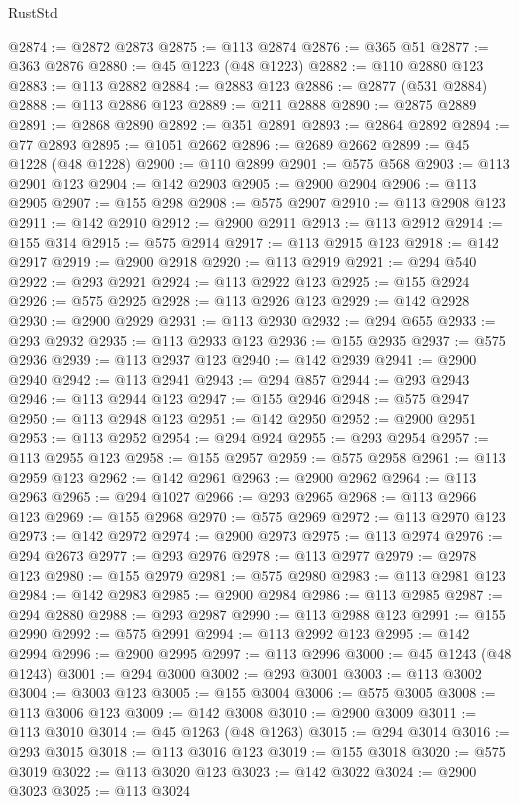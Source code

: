 \begin{lexlean}{RustStd}
\begin{coremodule}
@2874 := @2872 @2873
@2875 := @113 @2874
@2876 := @365 @51
@2877 := @363 @2876
@2880 := @45 @1223 (@48 @1223)
@2882 := @110 @2880 @123
@2883 := @113 @2882
@2884 := @2883 @123
@2886 := @2877 (@531 @2884)
@2888 := @113 @2886 @123
@2889 := @211 @2888
@2890 := @2875 @2889
@2891 := @2868 @2890
@2892 := @351 @2891
@2893 := @2864 @2892
@2894 := @77 @2893
@2895 := @1051 @2662
@2896 := @2689 @2662
@2899 := @45 @1228 (@48 @1228)
@2900 := @110 @2899
@2901 := @575 @568
@2903 := @113 @2901 @123
@2904 := @142 @2903
@2905 := @2900 @2904
@2906 := @113 @2905
@2907 := @155 @298
@2908 := @575 @2907
@2910 := @113 @2908 @123
@2911 := @142 @2910
@2912 := @2900 @2911
@2913 := @113 @2912
@2914 := @155 @314
@2915 := @575 @2914
@2917 := @113 @2915 @123
@2918 := @142 @2917
@2919 := @2900 @2918
@2920 := @113 @2919
@2921 := @294 @540
@2922 := @293 @2921
@2924 := @113 @2922 @123
@2925 := @155 @2924
@2926 := @575 @2925
@2928 := @113 @2926 @123
@2929 := @142 @2928
@2930 := @2900 @2929
@2931 := @113 @2930
@2932 := @294 @655
@2933 := @293 @2932
@2935 := @113 @2933 @123
@2936 := @155 @2935
@2937 := @575 @2936
@2939 := @113 @2937 @123
@2940 := @142 @2939
@2941 := @2900 @2940
@2942 := @113 @2941
@2943 := @294 @857
@2944 := @293 @2943
@2946 := @113 @2944 @123
@2947 := @155 @2946
@2948 := @575 @2947
@2950 := @113 @2948 @123
@2951 := @142 @2950
@2952 := @2900 @2951
@2953 := @113 @2952
@2954 := @294 @924
@2955 := @293 @2954
@2957 := @113 @2955 @123
@2958 := @155 @2957
@2959 := @575 @2958
@2961 := @113 @2959 @123
@2962 := @142 @2961
@2963 := @2900 @2962
@2964 := @113 @2963
@2965 := @294 @1027
@2966 := @293 @2965
@2968 := @113 @2966 @123
@2969 := @155 @2968
@2970 := @575 @2969
@2972 := @113 @2970 @123
@2973 := @142 @2972
@2974 := @2900 @2973
@2975 := @113 @2974
@2976 := @294 @2673
@2977 := @293 @2976
@2978 := @113 @2977
@2979 := @2978 @123
@2980 := @155 @2979
@2981 := @575 @2980
@2983 := @113 @2981 @123
@2984 := @142 @2983
@2985 := @2900 @2984
@2986 := @113 @2985
@2987 := @294 @2880
@2988 := @293 @2987
@2990 := @113 @2988 @123
@2991 := @155 @2990
@2992 := @575 @2991
@2994 := @113 @2992 @123
@2995 := @142 @2994
@2996 := @2900 @2995
@2997 := @113 @2996
@3000 := @45 @1243 (@48 @1243)
@3001 := @294 @3000
@3002 := @293 @3001
@3003 := @113 @3002
@3004 := @3003 @123
@3005 := @155 @3004
@3006 := @575 @3005
@3008 := @113 @3006 @123
@3009 := @142 @3008
@3010 := @2900 @3009
@3011 := @113 @3010
@3014 := @45 @1263 (@48 @1263)
@3015 := @294 @3014
@3016 := @293 @3015
@3018 := @113 @3016 @123
@3019 := @155 @3018
@3020 := @575 @3019
@3022 := @113 @3020 @123
@3023 := @142 @3022
@3024 := @2900 @3023
@3025 := @113 @3024

\end{coremodule}
\end{lexlean}

